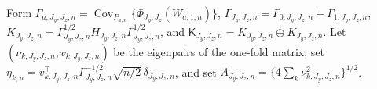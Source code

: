 Form \(\Gamma_{a,J_y,J_z,n}=\operatorname{Cov}_{P_{a,n}}\{\Phi_{J_y,J_z}(W_{a,1,n})\}\), \(\Gamma_{J_y,J_z,n}=\Gamma_{0,J_y,J_z,n}+\Gamma_{1,J_y,J_z,n}\), \(K_{J_y,J_z,n}=\Gamma_{J_y,J_z,n}^{1/2}H_{J_y,J_z,n}\Gamma_{J_y,J_z,n}^{1/2}\), and \(\mathsf K_{J_y,J_z,n}=K_{J_y,J_z,n}\oplus K_{J_y,J_z,n}\). Let \((\nu_{k,J_y,J_z,n},v_{k,J_y,J_z,n})\) be the eigenpairs of the one-fold matrix, set \(\eta_{k,n}=v_{k,J_y,J_z,n}^{\top}\Gamma_{J_y,J_z,n}^{-1/2}\sqrt{n/2}\,\delta_{J_y,J_z,n}\), and set \(A_{J_y,J_z,n}=\{4\sum_k\nu_{k,J_y,J_z,n}^2\}^{1/2}\).